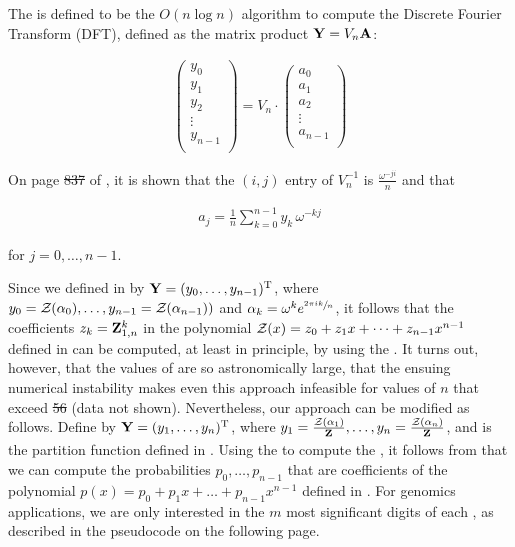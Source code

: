 \documentclass[11pt, oneside]{Thesis} %
\providecommand{\DIFadd}[1]{{\protect\color{blue}\uwave{#1}}} %
\providecommand{\DIFdel}[1]{{\protect\color{red}\sout{#1}}}                      %
\providecommand{\DIFaddbegin}{} %
\providecommand{\DIFaddend}{} %
\providecommand{\DIFdelbegin}{} %
\providecommand{\DIFdelend}{} %
\begin{document}
The \fft is defined to be the $O(n \log n)$
algorithm to compute the Discrete Fourier Transform (DFT), defined
as the matrix product ${\bf Y} = V_n {\bf A}$:

\begin{align}
\label{eq:fftbor:dftMatrix}
\left(
\begin{array}{l}
y_0 \\
y_1 \\
y_2 \\
\vdots \\
y_{n-1} \\
\end{array}
\right)
= V_n \cdot
\left(
\begin{array}{l}
a_0 \\
a_1 \\
a_2 \\
\vdots \\
a_{n-1} \\
\end{array}
\right)
\end{align}

On page \DIFdelbegin \DIFdel{837 }\DIFdelend \DIFaddbegin \DIFadd{$837$ }\DIFaddend of \citep{cormen}, it is shown that the
$(i,j)$ entry of $V_n^{-1}$ is $\frac{\omega^{-j i}}{n}$
and that

\begin{align}
\label{eq:fftbor:aFromY}
a_j = \frac{1}{n} \sum_{k=0}^{n-1} y_k\,\omega^{-kj}
\end{align}

for $j=0,\dots,n-1$.

Since we defined \bfY in  by ${\bf Y} =
(y_0,\dots,y_{n-1})^{\text T}$, where
\DIFdelbegin \DIFdel{$y_0={\mathcal Z}_{}(\alpha_0),\dots,y_{n-1}={\mathcal Z}_{}(\alpha_{n-1}))$
}\DIFdelend \DIFaddbegin \DIFadd{$y_0=\emZof{}{\alpha_0},\dots,y_{n-1}=\emZof{}{\alpha_{n-1}}$
}\DIFaddend and $\alpha_k = \omega^k e^{\sfrac{2 \pi i k}{n}}$, it follows that the coefficients
$z_k={\bf Z}^{k}_{1,n}$ in the polynomial
${\mathcal Z}_{}(x) = z_0 + z_1 x + \dots + z_{n-1} x^{n-1}$ defined in
 can be computed, at least in principle,
by using the \fft. It turns out, however, that the values of
 are so astronomically large, that the ensuing numerical
instability makes even this approach infeasible for values of $n$
that exceed \DIFdelbegin \DIFdel{56 }\DIFdelend \DIFaddbegin \DIFadd{$56$ }\DIFaddend (data not shown).
Nevertheless, our approach can be modified as follows.
Define \bfY by ${\bf Y} = (y_1,\dots,y_n)^{\text T}$, where
$y_1=\frac{{\mathcal Z}_{}(\alpha_1)}{{\bf Z}^{}_{}},\dots,
y_{n}=\frac{{\mathcal Z}_{}(\alpha_n)}{{\bf Z}^{}_{}}$, and
\fullZ is the partition function defined in .
Using the \fft to compute the \idft, it follows from
 that we can compute the probabilities $p_0,\dots,p_{n-1}$
that are coefficients of the polynomial
$p(x) = p_0 + p_1 x + \dots + p_{n-1}x^{n-1}$
defined in . For genomics applications, we are
only interested in the $m$ most significant digits of each \pk, as described
in the pseudocode on the following page.
\medskip
\end{document}
